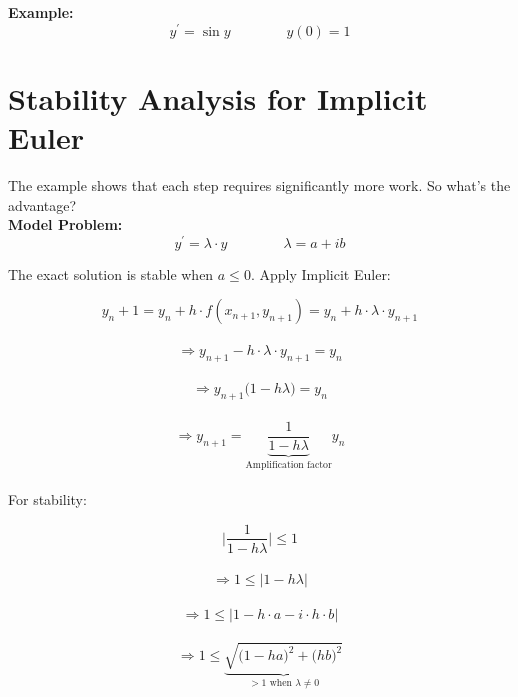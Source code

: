 \documentclass[a4paper,12pt]{report}
\begin{document}
	\noindent \textbf{Example:}
	$$ y^ \prime = \sin y \qquad \qquad y(0) = 1 $$
	
	
	
	
	
	\section{Stability Analysis for Implicit Euler}
	The example shows that each step requires significantly more work. So what's the advantage?\\
	
	\textbf{Model Problem:}
	$$ y^\prime = \lambda \cdot y \qquad \qquad \lambda = a + ib$$
	
	The exact solution is stable when $a \leq 0$.  Apply Implicit Euler:
	
	$$ y_n+1 = y_n + h \cdot f(x_{n+1}, y_{n+1}) = y_n + h \cdot \lambda \cdot y_{n+1}$$\\
	$$\Rightarrow y_{n+1} - h \cdot \lambda \cdot y_{n+1} = y_n$$\\
	$$\Rightarrow y_{n+1} \big( 1 - h \lambda \big) = y_n$$\\
	$$\Rightarrow y_{n+1} =\!\!\!\!\!\!\! 
	\underbrace{\frac{1}{1 - h \lambda}}_{\text{Amplification factor}} \!\!\!\!\!\!\!\!y_n $$\\
	
	For stability:
	
	$$\vert \frac{1}{1-h \lambda} \vert \leq 1 $$\\
	$$\Rightarrow 1 \leq \vert 1 - h \lambda \vert $$\\
	$$\Rightarrow 1 \leq \vert 1 - h \cdot a - i \cdot h \cdot b \vert  $$\\
	$$\Rightarrow 1 \leq \underbrace{\sqrt{ \big( 1 - ha \big)^2 + \big( hb \big)^2}}_{
	> 1 \,\, \text{when} \,\, \lambda \neq 0}   $$
	
\end{document}
